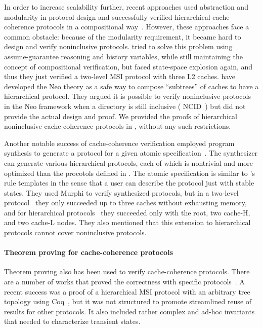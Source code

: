In order to increase scalability further, recent approaches used abstraction and modularity in protocol design and successfully verified hierarchical cache-coherence protocols in a compositional way~\cite{Chen:2008,Chen:2010,Opeoluwa:2016,Opeoluwa:2017}.
However, these approaches face a common obstacle: because of the modularity requirement, it became hard to design and verify noninclusive protocols.
\cite{Chen:2008,Chen:2010} tried to solve this problem using assume-guarantee reasoning and history variables, while still maintaining the concept of compositional verification, but faced state-space explosion again, and thus they just verified a two-level MSI protocol with three L2 caches.
\cite{Opeoluwa:2016,Opeoluwa:2017} have developed the Neo theory as a safe way to compose ``subtrees'' of caches to have a hierarchical protocol.
They argued it is possible to verify noninclusive protocols in the Neo framework when a directory is still inclusive (\eg{} NCID~\cite{Zhao:2010}) but did not provide the actual design and proof.
We provided the proofs of hierarchical noninclusive cache-coherence protocols in \hemiola{}, without any such restrictions.

Another notable success of cache-coherence verification employed program synthesis to generate a protocol for a given atomic specification~\cite{Oswald:2018,Oswald:2020}.
The synthesizer can generate various hierarchical protocols, each of which is nontrivial and more optimized than the procotols defined in \hemiola{}.
The atomic specification is similar to \hemiola{}'s rule templates in the sense that a user can describe the protocol just with stable states.
They used Murphi to verify synthesized protocols, but in a two-level protocol~\cite{Oswald:2018} they only succeeded up to three caches without exhausting memory, and for hierarchical protocols~\cite{Oswald:2020} they succeeded only with the root, two cache-H, and two cache-L nodes.
They also mentioned that this extension to hierarchical protocols cannot cover noninclusive protocols.

\paragraph{Theorem proving for cache-coherence protocols}

Theorem proving also has been used to verify cache-coherence protocols.
There are a number of works that proved the correctness with specific protocols~\cite{Park:1996,Moore:1998}.
A recent success was a proof of a hierarchical MSI protocol with an arbitrary tree topology using Coq~\cite{Murali:2015}, but it was not structured to promote streamlined reuse of results for other protocols.
It also included rather complex and ad-hoc invariants that needed to characterize transient states.

